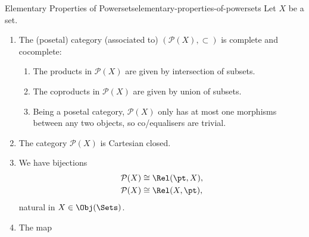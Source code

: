 \begin{proposition}{Elementary Properties of Powersets}{elementary-properties-of-powersets}%
    Let $X$ be a set.
    \begin{enumerate}
        \item\label{elementary-properties-of-powersets-co-completeness}The (posetal) category (associated to) $(\mathcal{P}(X),\subset)$ is complete and cocomplete:
            \begin{enumerate}
                \item\label{elementary-properties-of-powersets-co-completeness-a}The products in $\mathcal{P}(X)$ are given by intersection of subsets.
                \item\label{elementary-properties-of-powersets-co-completeness-b}The coproducts in $\mathcal{P}(X)$ are given by union of subsets.
                \item\label{elementary-properties-of-powersets-co-completeness-c}Being a posetal category, $\mathcal{P}(X)$ only has at most one morphisms between any two objects, so co/equalisers are trivial.
            \end{enumerate}
        \item\label{elementary-properties-of-powersets-cartesian-closedness}The category $\mathcal{P}(X)$ is Cartesian closed.
        \item\label{elementary-properties-of-powersets-powersets-as-sets-of-relations}We have bijections
            \begin{align*}
                \mathcal{P}(X) &\cong \Rel(\pt,X),\\
                \mathcal{P}(X) &\cong \Rel(X,\pt),
            \end{align*}
            natural in $X\in\Obj(\Sets)$.
        \item\label{properties-of-powersets-as-categories-interaction-with-products-1}The map
            \begin{webcompile}
\end{webcompile}
\end{enumerate}
\end{proposition}
